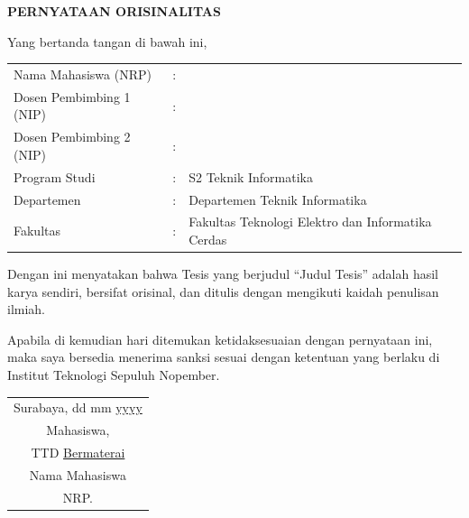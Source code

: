 
\newpage
\thispagestyle{plain}

\begin{center}
    {\fontsize{14}{16}\selectfont\bfseries {PERNYATAAN ORISINALITAS}}
\end{center}

\vspace{0.2cm}

\noindent
Yang bertanda tangan di bawah ini,

\vspace{0.5cm}

\noindent
\begin{tabular}{@{}p{4.9cm}@{}p{0.5cm}@{}p{9cm}@{}}
    Nama Mahasiswa (NRP) & : & \\
    Dosen Pembimbing 1 (NIP) & : & \\
    Dosen Pembimbing 2 (NIP) & : & \\
    Program Studi & : & S2 Teknik Informatika \\
    Departemen & : & Departemen Teknik Informatika \\
    Fakultas & : & Fakultas Teknologi Elektro dan Informatika Cerdas \\
\end{tabular}

\vspace{0.5cm}

\noindent
Dengan ini menyatakan bahwa Tesis yang berjudul ``Judul Tesis'' adalah hasil karya sendiri, bersifat orisinal, dan ditulis dengan mengikuti kaidah penulisan ilmiah.

\vspace{0.3cm}

\noindent
Apabila di kemudian hari ditemukan ketidaksesuaian dengan pernyataan ini, maka saya bersedia menerima sanksi sesuai dengan ketentuan yang berlaku di Institut Teknologi Sepuluh Nopember.

\vspace{1.5cm}

\begin{flushright}
\begin{tabular}{@{}c@{}}
    Surabaya, dd mm \underline{yyyy} \\
    Mahasiswa, \\[1.5cm]
    TTD \underline{Bermaterai} \\[0.5cm]
    Nama Mahasiswa \\
    NRP.
\end{tabular}
\end{flushright}


